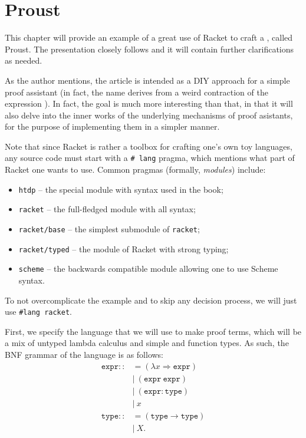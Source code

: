 \chapter{Proust}

This chapter will provide an example of a great use of Racket to craft
a , called Proust. The presentation closely
follows \cite{proust} and it will contain further clarifications as
needed.

As the author mentions, the article is intended as a DIY approach
for a simple proof assistant (in fact, the name derives from a weird
contraction of the expression ). In fact, the goal
is much more interesting than that, in that it will also delve into the
inner works of the underlying mechanisms of proof asistants, for the
purpose of implementing them in a simpler manner.

Note that since Racket is rather a toolbox for crafting one's own toy
languages, any source code must start with a \texttt{\# lang} pragma,
which mentions what part of Racket one wants to use. Common pragmas
(formally, \emph{modules}) include:
\begin{itemize}
\item \texttt{htdp} -- the special module with syntax used in the
  \cite{htdp} book;
\item \texttt{racket} -- the full-fledged module with all syntax;
\item \texttt{racket/base} -- the simplest submodule of \texttt{racket};
\item \texttt{racket/typed} -- the module of Racket with strong typing;
\item \texttt{scheme} -- the backwards compatible module allowing one
  to use Scheme syntax.
\end{itemize}

To not overcomplicate the example and to skip any decision process,
we will just use \texttt{\#lang racket}.

First, we specify the language that we will use to make proof terms,
which will be a mix of untyped lambda calculus and simple and function
types. As such, the BNF grammar of the language is as follows:
\begin{align*}
  \texttt{expr} ::&= (\lambda x \Rightarrow \texttt{expr}) \\
                  &| \ (\texttt{expr} \ \texttt{expr}) \\
                  &| \ (\texttt{expr} : \texttt{type}) \\
                  &| \ x \\
  \texttt{type} ::&= (\texttt{type} \to \texttt{type}) \\
                  &| \ X.
\end{align*}

